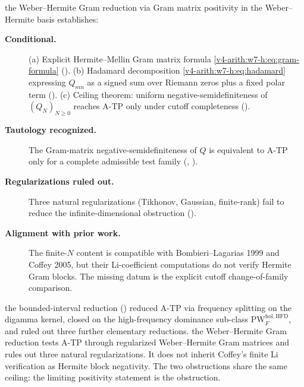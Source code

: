 \begin{remark}
\label{v4-arith:w7-h:rem:honest-form}
the Weber--Hermite Gram reduction via Gram matrix positivity in the Weber--Hermite basis establishes:
\begin{description}
\item[\textbf{Conditional.}] (a) Explicit Hermite--Mellin Gram matrix
formula \eqref{v4-arith:w7-h:eq:gram-formula}
().
(b) Hadamard decomposition
\eqref{v4-arith:w7-h:eq:hadamard} expressing \(Q_{mn}\) as a
signed sum over Riemann zeros plus a fixed polar term
().
(c) Ceiling theorem: uniform negative-semidefiniteness of
\((Q_{N})_{N\geq 0}\) reaches A-TP only under cutoff completeness
().
\item[\textbf{Tautology recognized.}] The Gram-matrix
negative-semidefiniteness of \(Q\) is equivalent to A-TP only for a
complete admissible test family
(,
).
\item[\textbf{Regularizations ruled out.}] Three natural
regularizations (Tikhonov, Gaussian, finite-rank) fail to reduce
the infinite-dimensional obstruction
().
\item[\textbf{Alignment with prior work.}] The finite-\(N\) content
is compatible with Bombieri--Lagarias 1999 and Coffey 2005, but their
Li-coefficient computations do not verify Hermite Gram blocks. The
missing datum is the explicit cutoff change-of-family comparison.
\end{description}
\end{remark}

\begin{remark}
\label{v4-arith:w7-h:rem:compare-w6}
the bounded-interval reduction () reduced A-TP via
frequency splitting on the digamma kernel, closed on the
high-frequency dominance sub-class
\(\mathrm{PW}^{\mathrm{hol},\mathrm{HFD}}_{F}\), and ruled out three
further elementary reductions. the Weber--Hermite Gram reduction tests A-TP through
regularized Weber--Hermite Gram matrices and rules out three natural
regularizations. It does not inherit Coffey's finite Li verification
as Hermite block negativity. The two obstructions share the same ceiling:
the limiting positivity statement is the obstruction.
\end{remark}

